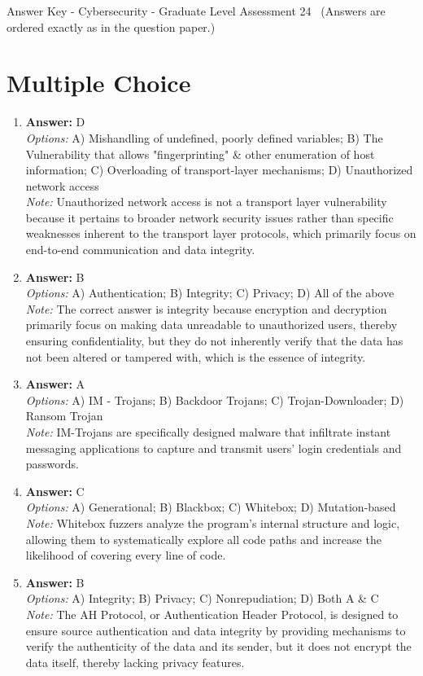 \documentclass[12pt]{article}
\begin{document}
\begin{center}
Answer Key - Cybersecurity - Graduate Level Assessment 24 \
\small (Answers are ordered exactly as in the question paper.)
\end{center}

\section*{Multiple Choice}
\begin{enumerate}[label=\arabic*.]
\item \textbf{Answer:} D
\\ \textit{Options:} A) Mishandling of undefined, poorly defined variables; B) The Vulnerability that allows "fingerprinting" \& other enumeration of host information; C) Overloading of transport-layer mechanisms; D) Unauthorized network access
\\ \textit{Note:} Unauthorized network access is not a transport layer vulnerability because it pertains to broader network security issues rather than specific weaknesses inherent to the transport layer protocols, which primarily focus on end-to-end communication and data integrity.
\item \textbf{Answer:} B
\\ \textit{Options:} A) Authentication; B) Integrity; C) Privacy; D) All of the above
\\ \textit{Note:} The correct answer is integrity because encryption and decryption primarily focus on making data unreadable to unauthorized users, thereby ensuring confidentiality, but they do not inherently verify that the data has not been altered or tampered with, which is the essence of integrity.
\item \textbf{Answer:} A
\\ \textit{Options:} A) IM - Trojans; B) Backdoor Trojans; C) Trojan-Downloader; D) Ransom Trojan
\\ \textit{Note:} IM-Trojans are specifically designed malware that infiltrate instant messaging applications to capture and transmit users' login credentials and passwords.
\item \textbf{Answer:} C
\\ \textit{Options:} A) Generational; B) Blackbox; C) Whitebox; D) Mutation-based
\\ \textit{Note:} Whitebox fuzzers analyze the program's internal structure and logic, allowing them to systematically explore all code paths and increase the likelihood of covering every line of code.
\item \textbf{Answer:} B
\\ \textit{Options:} A) Integrity; B) Privacy; C) Nonrepudiation; D) Both A \& C
\\ \textit{Note:} The AH Protocol, or Authentication Header Protocol, is designed to ensure source authentication and data integrity by providing mechanisms to verify the authenticity of the data and its sender, but it does not encrypt the data itself, thereby lacking privacy features.
\end{enumerate}
\end{document}
